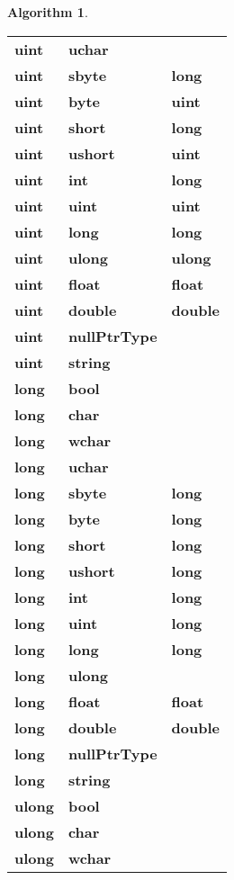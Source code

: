 \documentclass[a4paper,oneside,11pt]{book}
\theoremstyle{definition}
\newtheorem{algo}{Algorithm}[section]
\begin{document}
\begin{algo}
\begin{flushleft}
\begin{supertabular}{lll}
\textbf{uint}& \textbf{uchar}& \\
\textbf{uint}& \textbf{sbyte}& \textbf{long}\\
\textbf{uint}& \textbf{byte}& \textbf{uint}\\
\textbf{uint}& \textbf{short}& \textbf{long}\\
\textbf{uint}& \textbf{ushort}& \textbf{uint}\\
\textbf{uint}& \textbf{int}& \textbf{long}\\
\textbf{uint}& \textbf{uint}& \textbf{uint}\\
\textbf{uint}& \textbf{long}& \textbf{long}\\
\textbf{uint}& \textbf{ulong}& \textbf{ulong}\\
\textbf{uint}& \textbf{float}& \textbf{float}\\
\textbf{uint}& \textbf{double}& \textbf{double}\\
\textbf{uint}& \textbf{nullPtrType}& \\
\textbf{uint}& \textbf{string}& \\
\hline
\textbf{long}& \textbf{bool}& \\
\textbf{long}& \textbf{char}& \\
\textbf{long}& \textbf{wchar}& \\
\textbf{long}& \textbf{uchar}& \\
\textbf{long}& \textbf{sbyte}& \textbf{long} \\
\textbf{long}& \textbf{byte}& \textbf{long} \\
\textbf{long}& \textbf{short}& \textbf{long} \\
\textbf{long}& \textbf{ushort}& \textbf{long}\\
\textbf{long}& \textbf{int}& \textbf{long}\\
\textbf{long}& \textbf{uint}& \textbf{long}\\
\textbf{long}& \textbf{long}& \textbf{long}\\
\textbf{long}& \textbf{ulong}& \\
\textbf{long}& \textbf{float}& \textbf{float}\\
\textbf{long}& \textbf{double}& \textbf{double}\\
\textbf{long}& \textbf{nullPtrType}& \\
\textbf{long}& \textbf{string}& \\
\hline
\textbf{ulong}& \textbf{bool}& \\
\textbf{ulong}& \textbf{char}& \\
\textbf{ulong}& \textbf{wchar}& \\

\end{supertabular}
\end{flushleft}
\end{algo}
\end{document}
